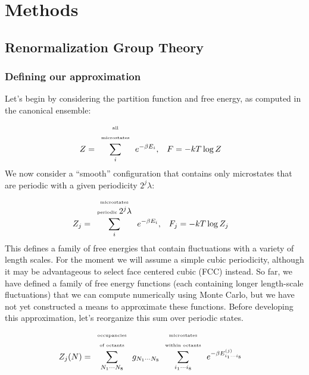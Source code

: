 \documentclass[letterpaper,twocolumn,amsmath,amssymb,pre,aps,10pt]{revtex4-1}
\begin{document}
\section{Methods}

\subsection{Renormalization Group Theory}

\subsubsection{Defining our approximation}
Let's begin by considering the partition function and free energy, as
computed in the canonical ensemble:
\begin{align}
  Z &= \sum_i^{\scriptscriptstyle\begin{array}{c}\text{\tiny all}\\\text{\tiny microstates}\end{array}}
       e^{-\beta E_i}, & F &= -kT\log Z
\end{align}
We now consider a ``smooth'' configuration that contains only
microstates that are periodic with a given periodicity $2^j\lambda$:
\begin{align}
  Z_j &= \sum_i^{\scriptscriptstyle\begin{array}{c}
                  \text{\tiny microstates}\\
                  \text{\tiny periodic }2^j\lambda\\
                 \end{array}}
       e^{-\beta E_i}, & F_j &= -kT\log Z_j
       \label{eq:Zn}
\end{align}
This defines a family of free energies that contain fluctuations with
a variety of length scales.  For the moment we will assume a simple
cubic periodicity, although it may be advantageous to select face
centered cubic (FCC) instead.  So far, we have defined a family of
free energy functions (each containing longer length-scale
fluctuations) that we can compute numerically using Monte Carlo, but
we have not yet constructed a means to approximate these functions.
Before developing this approximation, let's reorganize this sum over
periodic states.
\begin{align}
  Z_j(N) &= \sum_{N_1\cdots N_8}^{\scriptscriptstyle\begin{array}{c}
                  \text{\tiny occupancies}\\
                  \text{\tiny of octants}\\
                 \end{array}}
       g_{N_1\cdots N_8}
       \sum_{i_1\cdots i_8}^{\scriptscriptstyle\begin{array}{c}
                  \text{\tiny microstates}\\
                  \text{\tiny within octants}\\
                 \end{array}}
       e^{-\beta E_{i_1\cdots i_8}^{(j)}}
\end{align}
\end{document}
